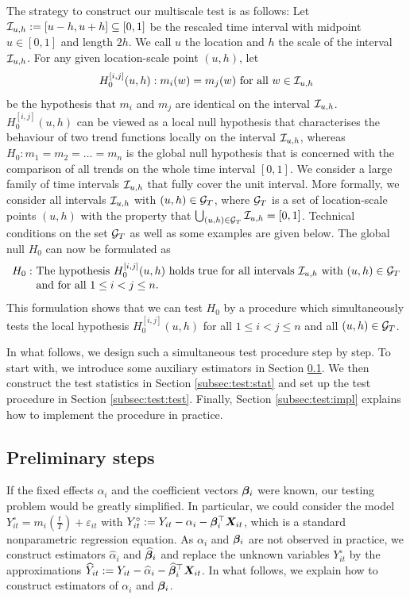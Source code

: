 \documentclass[12pt]{article}
\begin{document}
The strategy to construct our multiscale test is as follows: Let $\mathcal{I}_{u, h} := [u-h, u+h] \subseteq [0,1]$ be the rescaled time interval with midpoint $u \in [0,1]$ and length $2h$. We call $u$ the location
and $h$ the scale of the interval $\mathcal{I}_{u, h}$. For any given location-scale point $(u,h)$, let
\[ H_0^{[i, j]}(u, h): m_i(w) = m_j(w) \text{ for all } w \in \mathcal{I}_{u, h} \] 
be the hypothesis that $m_i$ and $m_j$ are identical on the interval $\mathcal{I}_{u, h}$. $H_0^{[i, j]}(u, h)$ can be viewed as a local null hypothesis that characterises the behaviour of two trend functions locally on the interval $\mathcal{I}_{u, h}$, whereas $H_0: m_1 = m_2 = \ldots = m_n$ is the global null hypothesis that is concerned with the comparison of all trends on the whole time interval $[0, 1]$. We consider a large family of time intervals $\mathcal{I}_{u, h}$ that fully cover the unit interval. More formally, we consider all intervals $\mathcal{I}_{u, h}$ with $(u,h) \in \mathcal{G}_T$, where $\mathcal{G}_T$ is a set of location-scale points $(u,h)$ with the property that $\bigcup_{(u, h) \in \mathcal{G}_T} \mathcal{I}_{u, h} = [0,1]$. Technical conditions on the set $\mathcal{G}_T$ as well as some examples are given below. The global null $H_0$ can now be formulated as 
\begin{align*}
H_0: \ & \text{The hypothesis } H_0^{[i, j]}(u, h) \text{ holds true for all intervals }  \mathcal{I}_{u, h} \text{ with } (u, h) \in \mathcal{G}_T \\[-0.075cm] & \text{and for all } 1 \le i < j \le n. 
\end{align*} 
This formulation shows that we can test $H_0$ by a procedure which simultaneously tests the local hypothesis $H_0^{[i, j]}(u, h)$ for all $1 \le i < j \le n$ and all $(u,h) \in \mathcal{G}_T$. 


In what follows, we design such a simultaneous test procedure step by step. To start with, we introduce some auxiliary estimators in Section \ref{subsec:test:prep}. We then construct the test statistics in Section \ref{subsec:test:stat} and set up the test procedure in Section \ref{subsec:test:test}. Finally, Section \ref{subsec:test:impl} explains how to implement the procedure in practice. 


\subsection{Preliminary steps}\label{subsec:test:prep}


If the fixed effects $\alpha_i$ and the coefficient vectors $\bm{\beta}_i$ were known, our testing problem would be greatly simplified. In particular, we could consider the model
$Y_{it}^\circ = m_i (\frac{t}{T}) + \varepsilon_{it}$ with $Y_{it}^\circ := Y_{it} - \alpha_i - \bm{\beta}_i^\top \boldsymbol{X}_{it}$,
which is a standard nonparametric regression equation. As $\alpha_i$ and $\bm{\beta}_i$ are not observed in practice, we construct estimators $\widehat{\alpha}_i$ and $\widehat{\bm{\beta}}_i$ and replace the unknown variables $Y_{it}^\circ$ by the approximations $\widehat{Y}_{it} := Y_{it} -\widehat{\alpha}_i - \widehat{\bm{\beta}}_i^\top \boldsymbol{X}_{it}$. In what follows, we explain how to construct estimators of $\alpha_i$ and $\bm{\beta}_i$. 
\end{document}
